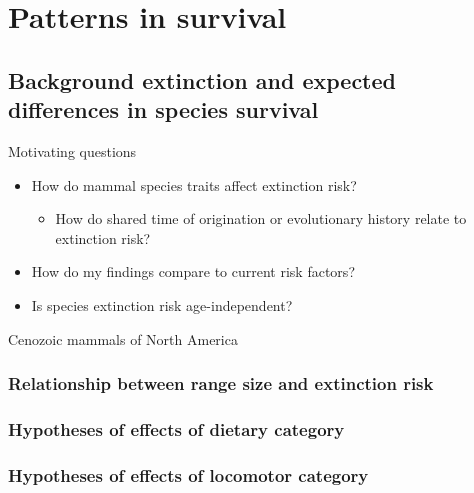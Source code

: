 \documentclass{beamer}
\begin{document}
\section{Patterns in survival}
\subsection{Background extinction and expected differences in species survival}

\begin{frame}
  \begin{block}{Motivating questions}
    \begin{itemize}
      \item \alert{How do mammal species traits affect extinction risk?}
        \begin{itemize}
          \item How do shared time of origination or evolutionary history relate to extinction risk?
        \end{itemize}
      \item How do my findings compare to current risk factors?
      \item Is species extinction risk age-independent?
    \end{itemize}
  \end{block}
\end{frame}

\begin{frame}
  Cenozoic mammals of North America
\end{frame}

\begin{frame}
  \frametitle{Relationship between range size and extinction risk}
  \begin{center}
  \end{center}

  \tiny{}
\end{frame}


\begin{frame}
  \frametitle{Hypotheses of effects of dietary category}
  \begin{center}
  \end{center}
\end{frame}

\begin{frame}
  \frametitle{Hypotheses of effects of locomotor category}
  \begin{center}
  \end{center}
\end{frame}
\end{document}
